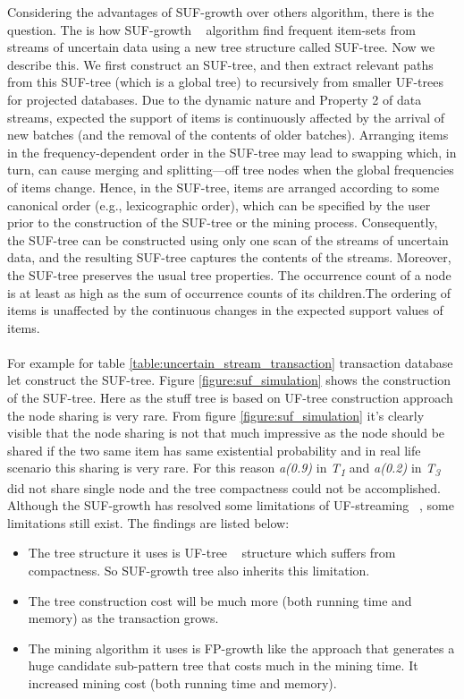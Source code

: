     Considering the advantages of SUF-growth over others algorithm, there is the question. The is how SUF-growth ~\cite{suf_growth} algorithm find frequent item-sets from streams of uncertain data using a new tree structure called SUF-tree. Now we describe this. We ﬁrst construct an SUF-tree, and then extract relevant paths from this SUF-tree (which is a global tree) to recursively from smaller UF-trees for projected databases. Due to the dynamic nature and Property 2 of data streams, expected the support of items is continuously affected by the arrival of new batches (and the removal of the contents of older batches). Arranging items in the frequency-dependent order in the SUF-tree may lead to swapping which, in turn, can cause merging and splitting—off tree nodes when the global frequencies of items change. Hence, in the SUF-tree, items are arranged according to some canonical order (e.g., lexicographic order), which can be speciﬁed by the user prior to the construction of the SUF-tree or the mining process. Consequently, the SUF-tree can be constructed using only one scan of the streams of uncertain data, and the resulting SUF-tree captures the contents of the streams. Moreover, the SUF-tree preserves the usual tree properties. The occurrence count of a node is at least as high as the sum of occurrence counts of its children.The ordering of items is unaffected by the continuous changes in the expected support values of items.\\ \\
    For example for table \ref{table:uncertain_stream_transaction} transaction database let construct the SUF-tree. Figure \ref{figure:suf_simulation} shows the construction of the SUF-tree. Here as the stuff tree is based on UF-tree construction approach the node sharing is very rare. From figure \ref{figure:suf_simulation} it’s clearly visible that the node sharing is not that much impressive as the node should be shared if the two same item has same existential probability and in real life scenario this sharing is very rare. For this reason \emph{a(0.9)} in \emph{T\textsubscript{1}} and \emph{a(0.2)} in \emph{T\textsubscript{3}} did not share single node and the tree compactness could not be accomplished.
    Although the SUF-growth has resolved some limitations of UF-streaming ~\cite{suf_growth}, some limitations still exist. The findings are listed below:
    \begin{itemize}
        \item The tree structure it uses is UF-tree ~\cite{uf_growth} structure which suffers from compactness. So SUF-growth tree also inherits this limitation.
        \item The tree construction cost will be much more (both running time and memory) as the transaction grows.
        \item The mining algorithm it uses is FP-growth like the approach that generates a huge candidate sub-pattern tree that costs much in the mining time. It increased mining cost (both running time and memory).
     \end{itemize}
    
